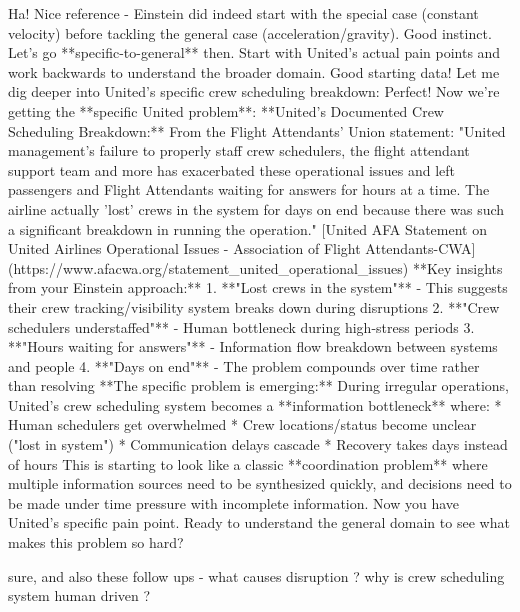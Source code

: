 \begin{botresponse}
Ha! Nice reference - Einstein did indeed start with the special case (constant velocity) before tackling the general case (acceleration/gravity). Good instinct.
Let's go **specific-to-general** then. Start with United's actual pain points and work backwards to understand the broader domain.
Good starting data! Let me dig deeper into United's specific crew scheduling breakdown:
Perfect! Now we're getting the **specific United problem**:
**United's Documented Crew Scheduling Breakdown:**
From the Flight Attendants' Union statement: "United management's failure to properly staff crew schedulers, the flight attendant support team and more has exacerbated these operational issues and left passengers and Flight Attendants waiting for answers for hours at a time. The airline actually 'lost' crews in the system for days on end because there was such a significant breakdown in running the operation." [United AFA Statement on United Airlines Operational Issues - Association of Flight Attendants-CWA](https://www.afacwa.org/statement\_united\_operational\_issues)
**Key insights from your Einstein approach:**
1.  **"Lost crews in the system"** - This suggests their crew tracking/visibility system breaks down during disruptions
2.  **"Crew schedulers understaffed"** - Human bottleneck during high-stress periods
3.  **"Hours waiting for answers"** - Information flow breakdown between systems and people
4.  **"Days on end"** - The problem compounds over time rather than resolving
**The specific problem is emerging:** During irregular operations, United's crew scheduling system becomes a **information bottleneck** where:
*   Human schedulers get overwhelmed
*   Crew locations/status become unclear ("lost in system")
*   Communication delays cascade
*   Recovery takes days instead of hours
This is starting to look like a classic **coordination problem** where multiple information sources need to be synthesized quickly, and decisions need to be made under time pressure with incomplete information.
Now you have United's specific pain point. Ready to understand the general domain to see what makes this problem so hard?
\end{botresponse}

\begin{userprompt}
sure, and also these follow ups - what causes disruption ? why is crew scheduling system human driven ?
\end{userprompt}

